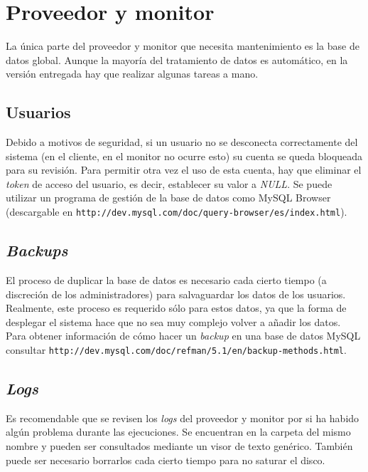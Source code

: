

\section*{Proveedor y monitor}
La única parte del proveedor y monitor que necesita mantenimiento es 
la base de datos global. Aunque la mayoría del tratamiento de datos es 
automático, en la versión \version entregada hay que realizar algunas 
tareas a mano.

\subsection*{Usuarios}
Debido a motivos de seguridad, si un usuario no se desconecta 
correctamente del sistema (en el cliente, en el monitor no ocurre 
esto) su cuenta se queda bloqueada para su revisión. Para permitir 
otra vez el uso de esta cuenta, hay que eliminar el \emph{token} de 
acceso del usuario, es decir, establecer su valor a \emph{NULL}. Se 
puede utilizar un programa de gestión de la base de datos como MySQL 
Browser (descargable en \texttt{http://dev.mysql.com/doc/query-browser/es/index.html}).

\subsection*{\emph{Backups}}
El proceso de duplicar  la base de datos es necesario 
cada cierto tiempo (a discreción de los administradores) para 
salvaguardar los datos de los usuarios. Realmente, este proceso es 
requerido sólo para estos datos, ya que la forma de desplegar el 
sistema hace que no sea muy complejo volver a añadir los datos. Para 
obtener información de cómo hacer un \emph{backup} en una base de 
datos MySQL consultar \texttt{http://dev.mysql.com/doc/refman/5.1/en/backup-methods.html}.

\subsection*{\emph{Logs}}
Es recomendable que se revisen los \emph{logs}  del 
proveedor y monitor por si ha habido algún problema durante las 
ejecuciones. Se encuentran en la carpeta del mismo nombre y pueden ser 
consultados mediante un visor de texto genérico. También puede ser 
necesario borrarlos cada cierto tiempo para no saturar el disco.

